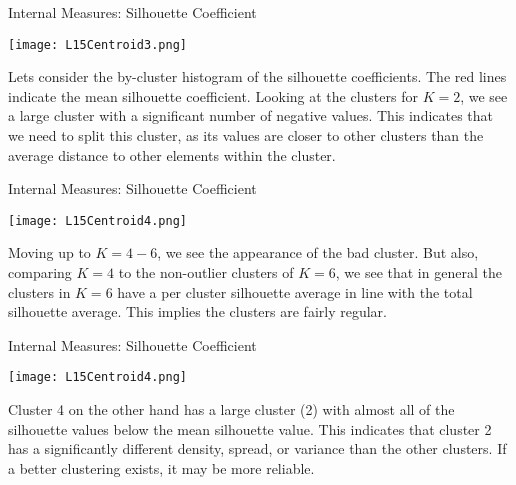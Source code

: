 \documentclass[10pt, table, dvipsnames,xcdraw,handout]{beamer}
\begin{document}
\begin{frame}[fragile]{Internal Measures: Silhouette Coefficient}
 \begin{minipage}[t][0.5\textheight][t]{\textwidth}
	\centering \texttt{[image: L15Centroid3.png]} 
  \end{minipage}
  \vfill
\begin{minipage}[t][0.5\textheight][t]{\textwidth}
Lets consider the by-cluster histogram of the silhouette coefficients. The red lines indicate the mean silhouette coefficient. Looking at the clusters for $K=2$, we see a large cluster with a significant number of negative values. This indicates that we need to split this cluster, as its values are closer to other clusters than the average distance to other elements within the cluster. 
\end{minipage}
\end{frame}





\begin{frame}[fragile]{Internal Measures: Silhouette Coefficient}
 \begin{minipage}[t][0.5\textheight][t]{\textwidth}
	\centering \texttt{[image: L15Centroid4.png]} 
  \end{minipage}
  \vfill
\begin{minipage}[t][0.5\textheight][t]{\textwidth}
Moving up to $K = 4- 6$, we see the appearance of the bad cluster. But also, comparing $K = 4$ to the non-outlier clusters of $K=6$, we see that in general the clusters in $K=6$ have a per cluster silhouette average in line with the total silhouette average. This implies the clusters are fairly regular. 
\end{minipage}
\end{frame}


\begin{frame}[fragile]{Internal Measures: Silhouette Coefficient}
 \begin{minipage}[t][0.5\textheight][t]{\textwidth}
	\centering \texttt{[image: L15Centroid4.png]} 
  \end{minipage}
  \vfill
\begin{minipage}[t][0.5\textheight][t]{\textwidth}
Cluster 4 on the other hand has a large cluster (2) with almost all of the silhouette values below the mean silhouette value. This indicates that cluster 2 has a significantly different density, spread, or variance than the other clusters. If a better clustering exists, it may be more reliable. 
\end{minipage}
\end{frame}
\end{document}
